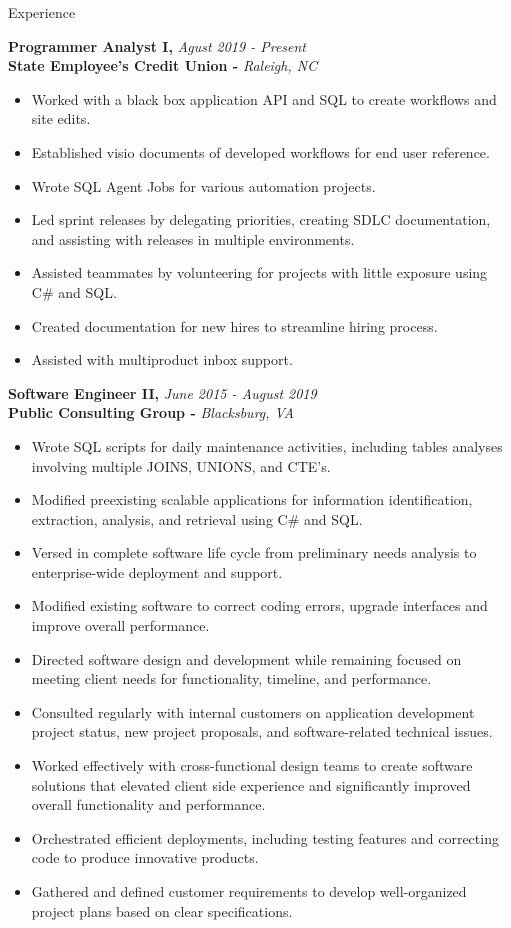 \documentclass{resume} %
\begin{document}
\begin{rSection}{Experience}

{\bf Programmer Analyst I, }{\em Agust 2019 - Present} 
\\
{\bf State Employee's Credit Union -  }{\em Raleigh, NC}
\begin{itemize}
\item Worked with a black box application API and SQL to create workflows and site edits.
\item Established visio documents of developed workflows for end user reference.
\item Wrote SQL Agent Jobs for various automation projects.
\item Led sprint releases by delegating priorities, creating SDLC documentation, and assisting with releases in multiple environments.
\item Assisted teammates by volunteering for projects with little exposure using C\# and SQL.
\item Created documentation for new hires to streamline hiring process.
\item Assisted with multiproduct inbox support. 
\end{itemize}

{\bf Software Engineer II, }{\em June 2015 - August 2019} 
\\
{\bf Public Consulting Group -  }{\em Blacksburg, VA}
\begin{itemize}
\item Wrote SQL scripts for daily maintenance activities, including tables analyses involving multiple JOINS, UNIONS, and CTE's.
\item Modified preexisting scalable applications for information identification, extraction, analysis, and retrieval using C\# and SQL.
\item Versed in complete software life cycle from preliminary needs analysis to enterprise-wide deployment and support.
\item Modified existing software to correct coding errors, upgrade interfaces and improve overall performance.
\item Directed software design and development while remaining focused on meeting client needs for functionality, timeline, and performance.
\item Consulted regularly with internal customers on application development project status, new project proposals, and software-related technical issues.
\item Worked effectively with cross-functional design teams to create software solutions that elevated client side experience and significantly improved overall functionality and performance.
\item Orchestrated efficient deployments, including testing features and correcting code to produce innovative products.
\item Gathered and defined customer requirements to develop well-organized project plans based on clear specifications.
\end{itemize}
\end{rSection}
\end{document}
